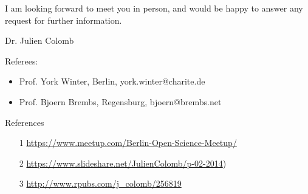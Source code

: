  I am looking forward to meet you in person, and would be happy to answer any request for further information.


Dr. Julien Colomb





\newpage





%
Referees:
\begin{itemize}[noitemsep,topsep=0pt]
\item Prof. York Winter, Berlin, york.winter@charite.de
 
\item Prof. Bjoern Brembs, Regensburg, bjoern@brembs.net
\end{itemize}

References
\begin{itemize}[noitemsep,topsep=0pt]

\item [1] \url{https://www.meetup.com/Berlin-Open-Science-Meetup/}
\item [2]  \url{https://www.slideshare.net/JulienColomb/p-02-2014})
\item [3] \url{http://www.rpubs.com/j_colomb/256819}


\end{itemize}
\newpage 

